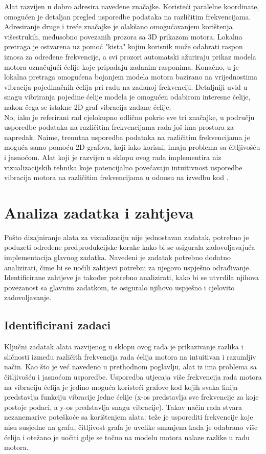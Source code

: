 \documentclass[times, utf8, diplomski]{fer}
\begin{document}
Alat razvijen u \citep{matkovic2021getting} dobro adresira navedene značajke. Koristeći paralelne koordinate, omogućen je detaljan pregled usporedbe podataka na različitim frekvencijama. Adresiranje druge i treće značajke je olakšano omogućavanjem korištenja višestrukih, međusobno povezanih prozora sa 3D prikazom motora. Lokalna pretraga je ostvarena uz pomoć "kista" kojim korisnik može odabrati raspon iznosa za određene frekvencije, a svi prozori automatski ažuriraju prikaz modela motora označujući ćelije koje pripadaju zadanim rasponima. Konačno, u \citep{matkovic2021getting} je lokalna pretraga omogućena bojanjem modela motora bazirano na vrijednostima vibracija pojedinačnih ćelija pri radu na zadanoj frekvenciji. Detaljniji uvid u snagu vibriranja pojedine ćelije modela je omogućen odabirom interesne ćelije, nakon čega se istakne 2D graf vibracija  zadane ćelije.\\
No, iako je referirani rad cjelokupno odlično pokrio sve tri značajke, u području usporedbe podataka na različitim frekvencijama rada još ima prostora za napredak. Naime, trenutna usporedba podataka na različitim frekvencijama je moguća samo pomoću 2D grafova, koji iako korisni, imaju problema sa čitljivošću i jasnoćom. Alat koji je razvijen u sklopu ovog rada implementira niz vizualizacijskih tehnika koje potencijalno povećavaju intuitivnost usporedbe vibracija motora na različitim frekvencijama u odnosu na izvedbu kod \citep{matkovic2021getting}.

\chapter{Analiza zadatka i zahtjeva}
Pošto dizajniranje alata za vizualizaciju nije jednostavan zadatak, potrebno je poduzeti određene predprodukcijske korake kako bi se osigurala zadovoljavajuća implementacija glavnog zadatka. Navedeni je zadatak potrebno dodatno analizirati, čime bi se uočili zahtjevi potrebni za njegovo uspješno odrađivanje. Identificirane zahtjeve je također potrebno analizirati, kako bi se utvrdila njihova povezanost sa glavnim zadatkom, te osiguralo njihovo uspješno i cjelovito zadovoljavanje. 

\section{Identificirani zadaci}
Ključni zadatak alata razvijenog u sklopu ovog rada je prikazivanje razlika i sličnosti između različith frekvencija rada ćelija motora na intuitivan i razumljiv način. Kao što je već navedeno u prethodnom poglavlju, alat iz \citep{matkovic2021getting} ima problema sa čitljivošću i jasnoćom usporedbe. Usporedba utjecaja više frekvencija rada motora na vibraciju ćelija je jedino moguća koristeći grafove kod kojih svaka linija predstavlja funkciju vibracije jedne ćelije (x-os predstavlja sve frekvencije za koje postoje podaci, a y-os predstavlja snagu vibracije). Takav način rada stvara nezanemarive poteškoće sa korištenjem alata: teže je usporediti frekvencije koje nisu susjedne na grafu, čitljivost grafa je uvelike smanjena kada je odabrano više ćelija i otežano je uočiti gdje se točno na modelu motora nalaze razlike u radu motora.
\end{document}
